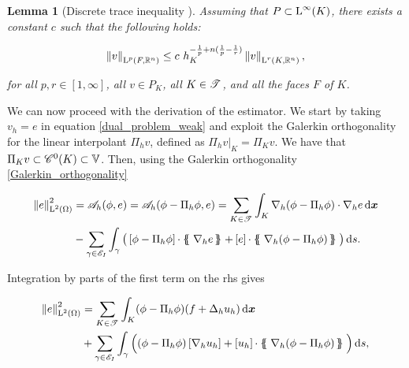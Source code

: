 \documentclass[a4paper,11pt]{article}
\newtheorem{lemma}[theorem]{Lemma}
\begin{document}
\begin{lemma}[Discrete trace inequality {\cite{Guermond:2021}}]
\label{lemma:discrete_trace_ineq}
Assuming that $P \subset \operatorname L^{\infty}(K)$, there exists a constant $c$ such that the following holds:

\begin{equation}
    \left\|v\right\|_{\operatorname L^{p}(F,\mathbb R^{n})} \leq c \  h_{K}^{-\frac{1}{p} + n(\frac{1}{p} - \frac{1}{r})}\left\|v\right\|_{\operatorname L^{r}(K,\mathbb R^{n})},
\end{equation}

for all $p,r \in [1,\infty]$, all $v \in P_{K}$, all $K \in \mathscr T^{}$, and all the faces $F$ of $K$.

\end{lemma}

We can now proceed with the derivation of the estimator. We start by taking $v_{h} = e$ in equation \eqref{dual_problem_weak} and exploit the Galerkin orthogonality for the linear interpolant $\Pi_{h}v$, defined as $\Pi_{h}v |_{K} = \Pi_{K}v$. We have that $\Pi_{K}v \subset \mathscr C^{0}(K) \subset \mathbb V$. Then, using the Galerkin orthogonality \eqref{Galerkin_orthogonality}

\begin{equation}
\begin{split}
\Norm{e}^2_{\leb{2}(\Omega)} &=  \cA_{h}(\phi,e) = \cA_{h}(\phi - \Pi_{h} \phi,e) = \sum_{K \in \T{}} \int_{K} \nabla_{h} (\phi - \Pi_{h} \phi) \cdot \nabla_{h} e \d \vec{x} \\
  & - \sum_{\gamma \in \cE_{I}}\int_{\gamma} \big( \jump{\phi - \Pi_{h} \phi} \cdot \avg{\nabla_{h}e} + \jump{e} \cdot \avg{\nabla_{h}(\phi - \Pi_{h} \phi)} \big) \d s.   
\end{split}
\label{eq:l2-a-posteriori-estimate}
\end{equation}


Integration by parts of the first term on the rhs gives 

\begin{equation*}
\begin{split}
\Norm{e}^2_{\leb{2}(\Omega)} &= \sum_{K \in \T{}} \int_{K} (\phi - \Pi_{h} \phi) (f + \Delta_{h} u_{h}) \d \vec{x} \\
&+ \sum_{\gamma \in \cE_{I}} \int_{\gamma} \Big( (\phi - \Pi_{h} \phi) \jump{\nabla_{h} u_{h}} + \jump{u_{h}} \cdot \avg{\nabla_{h}(\phi - \Pi_{h} \phi)} \Big ) \d s,
\end{split}
\end{equation*}
\end{document}
